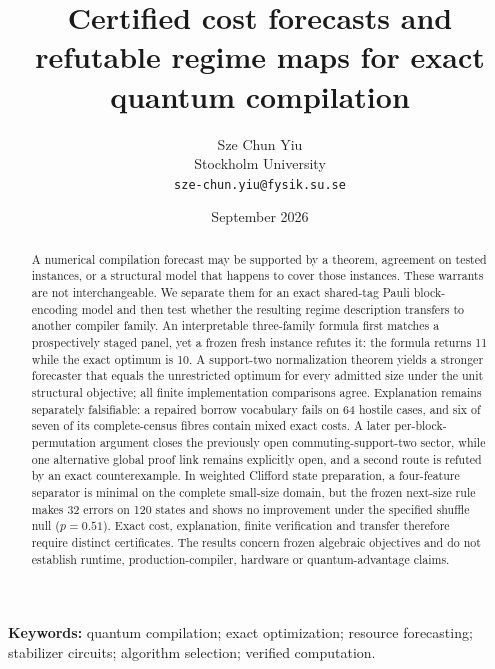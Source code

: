 \documentclass[11pt]{article}
\theoremstyle{definition}
\begin{document}
\title{Certified cost forecasts and refutable regime maps for exact quantum compilation}
\author{Sze Chun Yiu\\Stockholm University\\\texttt{sze-chun.yiu@fysik.su.se}}
\date{September 2026}
\maketitle
\begin{abstract}
A numerical compilation forecast may be supported by a theorem, agreement on tested instances, or a structural model that happens to cover those instances.  These warrants are not interchangeable.  We separate them for an exact shared-tag Pauli block-encoding model and then test whether the resulting regime description transfers to another compiler family.  An interpretable three-family formula first matches a prospectively staged panel, yet a frozen fresh instance refutes it: the formula returns 11 while the exact optimum is 10.  A support-two normalization theorem yields a stronger forecaster that equals the unrestricted optimum for every admitted size under the unit structural objective; all finite implementation comparisons agree.  Explanation remains separately falsifiable: a repaired borrow vocabulary fails on 64 hostile cases, and six of seven of its complete-census fibres contain mixed exact costs.  A later per-block-permutation argument closes the previously open commuting-support-two sector, while one alternative global proof link remains explicitly open, and a second route is refuted by an exact counterexample.  In weighted Clifford state preparation, a four-feature separator is minimal on the complete small-size domain, but the frozen next-size rule makes 32 errors on 120 states and shows no improvement under the specified shuffle null ($p=0.51$).  Exact cost, explanation, finite verification and transfer therefore require distinct certificates.  The results concern frozen algebraic objectives and do not establish runtime, production-compiler, hardware or quantum-advantage claims.
\end{abstract}
\noindent\textbf{Keywords:} quantum compilation; exact optimization; resource forecasting; stabilizer circuits; algorithm selection; verified computation.












\end{document}
